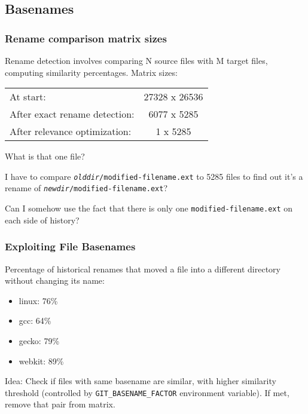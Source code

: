 \documentclass[compress,t]{beamer}
\begin{document}
\subsection{Basenames}

\begin{frame}
  \frametitle{Rename comparison matrix sizes}

  Rename detection involves comparing N source files with M target files,
  computing similarity percentages.  Matrix sizes:\\[1em]
  \pause
  \qquad
  \begin{tabular}{lc}
    At start:                     & 27328 x 26536 \\
    After exact rename detection: &  6077 x  5285 \\
    After relevance optimization: &   \hspace*{1.75em}1 x  5285
  \end{tabular}

  \pause
  \vspace*{\baselineskip}
  What is that one file?

  \pause
  \vspace*{\baselineskip}
  I have to compare \texttt{\textit{olddir}/modified-filename.ext} to
  5285 files to find out it's a rename
  of \texttt{\textit{newdir}/modified-filename.ext}?

  \pause
  \vspace*{\baselineskip}
  Can I somehow use the fact that there is only
  one \texttt{modified-filename.ext} on each side of history?
  
\end{frame}


\begin{frame}
  \frametitle{Exploiting File Basenames}

  Percentage of historical renames that moved a file into a different
  directory without changing its name:
  \pause
  \begin{itemize}
    \item linux: 76\%
    \item gcc: 64\%
    \item gecko: 79\%
    \item webkit: 89\%
  \end{itemize}

  \pause
  \vspace*{\baselineskip}
  Idea: Check if files with same basename are similar, with higher
  similarity threshold (controlled by \texttt{GIT\_BASENAME\_FACTOR}
  environment variable).  If met, remove that pair from matrix.

\end{frame}
\end{document}

